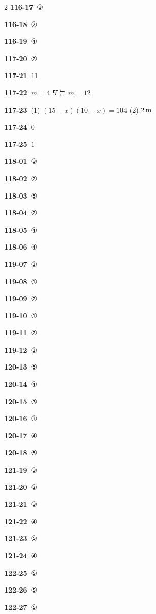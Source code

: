 \documentclass[10pt,a4paper]{article}
\begin{document}
\begin{multicols}{2}
\noindent\textbf{116-17}\ ③\par
\noindent\textbf{116-18}\ ②\par
\noindent\textbf{116-19}\ ④\par
\noindent\textbf{117-20}\ ②\par
\noindent\textbf{117-21}\ $11$\par
\noindent\textbf{117-22}\ $m=4$ 또는 $m=12$\par
\noindent\textbf{117-23}\ (1) $(15-x)(10-x)=104$ (2) $2\mkern3mu \mathrm{m}$\par
\noindent\textbf{117-24}\ $0$\par
\noindent\textbf{117-25}\ $1$\par
\noindent\textbf{118-01}\ ③\par
\noindent\textbf{118-02}\ ②\par
\noindent\textbf{118-03}\ ⑤\par
\noindent\textbf{118-04}\ ②\par
\noindent\textbf{118-05}\ ④\par
\noindent\textbf{118-06}\ ④\par
\noindent\textbf{119-07}\ ①\par
\noindent\textbf{119-08}\ ①\par
\noindent\textbf{119-09}\ ②\par
\noindent\textbf{119-10}\ ①\par
\noindent\textbf{119-11}\ ②\par
\noindent\textbf{119-12}\ ①\par
\noindent\textbf{120-13}\ ⑤\par
\noindent\textbf{120-14}\ ④\par
\noindent\textbf{120-15}\ ③\par
\noindent\textbf{120-16}\ ①\par
\noindent\textbf{120-17}\ ④\par
\noindent\textbf{120-18}\ ⑤\par
\noindent\textbf{121-19}\ ③\par
\noindent\textbf{121-20}\ ②\par
\noindent\textbf{121-21}\ ③\par
\noindent\textbf{121-22}\ ④\par
\noindent\textbf{121-23}\ ⑤\par
\noindent\textbf{121-24}\ ④\par
\noindent\textbf{122-25}\ ⑤\par
\noindent\textbf{122-26}\ ⑤\par
\noindent\textbf{122-27}\ ⑤\par

\end{multicols}
\end{document}
